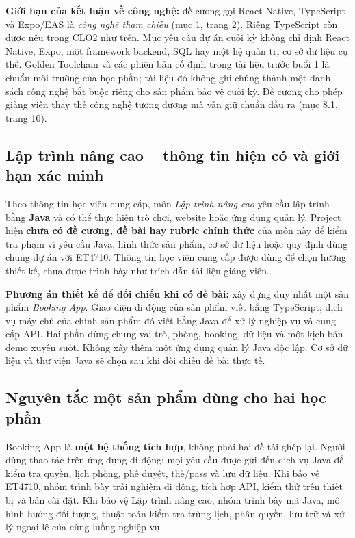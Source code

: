 \documentclass[12pt,a4paper]{article}
\begin{document}
\textbf{Giới hạn của kết luận về công nghệ:} đề cương gọi React Native, TypeScript và Expo/EAS là \emph{công nghệ tham chiếu} (mục 1, trang 2). Riêng TypeScript còn được nêu trong CLO2 như trên. Mục yêu cầu dự án cuối kỳ không chỉ định React Native, Expo, một framework backend, SQL hay một hệ quản trị cơ sở dữ liệu cụ thể. Golden Toolchain và các phiên bản cố định trong tài liệu trước buổi 1 là chuẩn môi trường của học phần; tài liệu đó không ghi chúng thành một danh sách công nghệ bắt buộc riêng cho sản phẩm bảo vệ cuối kỳ. Đề cương cho phép giảng viên thay thế công nghệ tương đương mà vẫn giữ chuẩn đầu ra (mục 8.1, trang 10).

\subsection{Lập trình nâng cao -- thông tin hiện có và giới hạn xác minh}

Theo thông tin học viên cung cấp, môn \emph{Lập trình nâng cao} yêu cầu lập trình bằng \textbf{Java} và có thể thực hiện trò chơi, website hoặc ứng dụng quản lý. Project hiện \textbf{chưa có đề cương, đề bài hay rubric chính thức} của môn này để kiểm tra phạm vi yêu cầu Java, hình thức sản phẩm, cơ sở dữ liệu hoặc quy định dùng chung dự án với ET4710. Thông tin học viên cung cấp được dùng để chọn hướng thiết kế, chưa được trình bày như trích dẫn tài liệu giảng viên.

\textbf{Phương án thiết kế để đối chiếu khi có đề bài:} xây dựng duy nhất một sản phẩm \emph{Booking App}. Giao diện di động của sản phẩm viết bằng TypeScript; dịch vụ máy chủ của chính sản phẩm đó viết bằng Java để xử lý nghiệp vụ và cung cấp API. Hai phần dùng chung vai trò, phòng, booking, dữ liệu và một kịch bản demo xuyên suốt. Không xây thêm một ứng dụng quản lý Java độc lập. Cơ sở dữ liệu và thư viện Java sẽ chọn sau khi đối chiếu đề bài thực tế.

\subsection{Nguyên tắc một sản phẩm dùng cho hai học phần}

Booking App là \textbf{một hệ thống tích hợp}, không phải hai đề tài ghép lại. Người dùng thao tác trên ứng dụng di động; mọi yêu cầu được gửi đến dịch vụ Java để kiểm tra quyền, lịch phòng, phê duyệt, thẻ/pass và lưu dữ liệu. Khi bảo vệ ET4710, nhóm trình bày trải nghiệm di động, tích hợp API, kiểm thử trên thiết bị và bản cài đặt. Khi bảo vệ Lập trình nâng cao, nhóm trình bày mã Java, mô hình hướng đối tượng, thuật toán kiểm tra trùng lịch, phân quyền, lưu trữ và xử lý ngoại lệ của cùng luồng nghiệp vụ.
\end{document}
